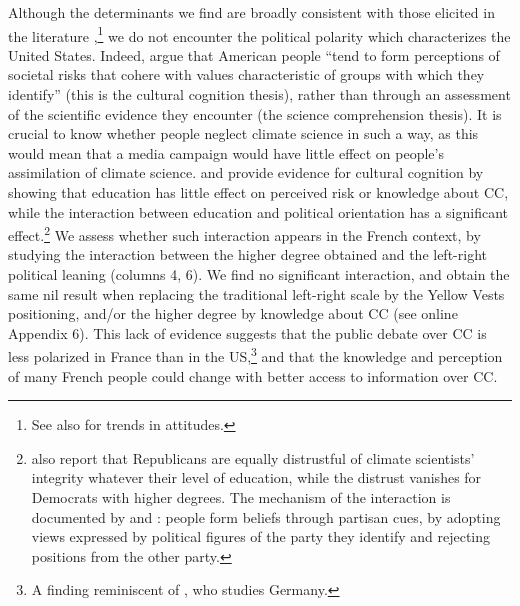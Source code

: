 \documentclass[english,5p,authoryear]{elsarticle}
\begin{document}
Although the determinants we find are broadly consistent with those elicited in the literature \citep{upham_public_2009,whitmarsh_scepticism_2011, ademe_representations_2018},\footnote{See also \citet{capstick_international_2015} for trends in attitudes.} we do not encounter the political polarity which characterizes the United States. Indeed, \citet{kahan_polarizing_2012} argue that American people ``tend to form perceptions of societal risks that cohere with values characteristic of groups with which they identify'' (this is the cultural cognition thesis), rather than through an assessment of the scientific evidence they encounter (the science comprehension thesis). It is crucial to know whether people neglect climate science in such a way, as this would mean that a media campaign would have little effect on people's assimilation of climate science. \citet{kahan_polarizing_2012} and \citet{mccright_politicization_2011} provide evidence for cultural cognition by showing that education has little effect on perceived risk or knowledge about CC, while the interaction between education and political orientation has a significant effect.\footnote{\citet{funk_politics_2016} also report that Republicans are equally distrustful of climate scientists' integrity whatever their level of education, while the distrust vanishes for Democrats with higher degrees. The mechanism of the interaction is documented by \citet{ehret_partisan_2018} and \citet{van_boven_psychological_2018}: people form beliefs through partisan cues, by adopting views expressed by political figures of the party they identify and rejecting positions from the other party.} We assess whether such interaction appears in the French context, by studying the interaction between the higher degree obtained and the left-right political leaning (columns 4, 6). We find no significant interaction, and obtain the same nil result when replacing the traditional left-right scale by the Yellow Vests positioning, and/or the higher degree by knowledge about CC (see online Appendix 6). This lack of evidence suggests that the public debate over CC is less polarized in France than in the US,\footnote{A finding reminiscent of \citet{ziegler_political_2017}, who studies Germany.} and that the knowledge and perception of many French people could change with better access to information over CC. %

%


%
%

%
\end{document}
